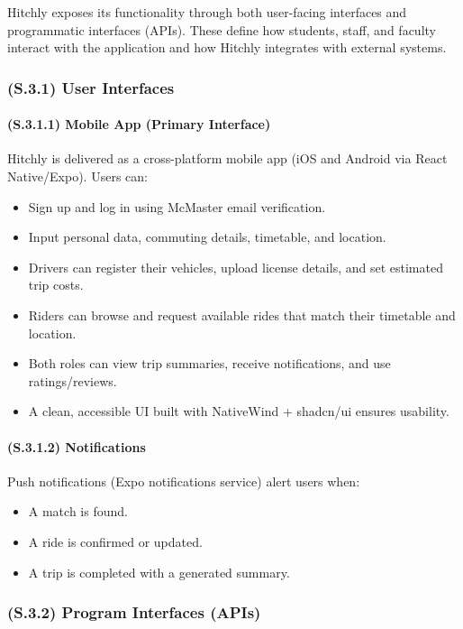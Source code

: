 \documentclass[12pt,letterpaper]{article}
\begin{document}
Hitchly exposes its functionality through both user-facing interfaces and programmatic interfaces (APIs). These define how students, staff, and faculty interact with the application and how Hitchly integrates with external systems.

\subsubsection{(S.3.1) User Interfaces} %

\paragraph{(S.3.1.1) Mobile App (Primary Interface)} %
Hitchly is delivered as a cross-platform mobile app (iOS and Android via React Native/Expo). Users can:

\begin{itemize}
    \item Sign up and log in using McMaster email verification.
    \item Input personal data, commuting details, timetable, and location.
    \item Drivers can register their vehicles, upload license details, and set estimated trip costs.
    \item Riders can browse and request available rides that match their timetable and location.
    \item Both roles can view trip summaries, receive notifications, and use ratings/reviews.
    \item A clean, accessible UI built with NativeWind + shadcn/ui ensures usability.
\end{itemize}

\paragraph{(S.3.1.2) Notifications} %
Push notifications (Expo notifications service) alert users when:

\begin{itemize}
    \item A match is found.
    \item A ride is confirmed or updated.
    \item A trip is completed with a generated summary.
\end{itemize}

\subsubsection{(S.3.2) Program Interfaces (APIs)} %
\end{document}
